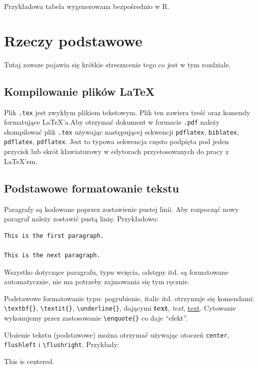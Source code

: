 \documentclass[polish, twoside, 12pt, a4paper]{article}
\theoremstyle{definition}
\theoremstyle{plain}
\theoremstyle{remark}
\begin{document}
Przykładowa tabela wygenerowana bezpośrednio w R.



\clearpage
\section{Rzeczy podstawowe}

Tutaj zawsze pojawia się krótkie streszzcenie tego co jest w tym rozdziale.

\subsection{Kompilowanie plików \LaTeX}

Plik  \verb+.tex+ jest zwykłym plikiem tekstowym. Plik ten zawiera treść oraz komendy formatujące \LaTeX'a.Aby otrzymać dokument w formacie \verb+.pdf+ należy skompilować plik \verb+.tex+ używając następującej sekwencji \verb+pdflatex+, \verb+biblatex+, \verb+pdflatex+, \verb+pdflatex+. Jest to typowa sekwencja często podpięta pod jeden przycisk lub skrót klawiaturowy w edytorach przystosowanych do pracy z \LaTeX'em.

\subsection{Podstawowe formatowanie tekstu}

Paragrafy są kodowane poprzez zostawienie pustej linii. Aby rozpocząć nowy paragraf należy zostawić pustą linię. Przykładowo:
\begin{verbatim}
This is the first paragraph.

This is the next paragraph.
\end{verbatim}

Wszystko dotyczące paragrafu, typu wcięcia, odstępy itd. są formatowane automatycznie, nie ma potrzeby zajmowania się tym ręcznie.

Podstawowe formatowanie typu: pogrubienie, italic itd. otrzymuje się komendami: \verb+\textbf{}+, \verb+\textit{}+, \verb+\underline{}+, dającymi \textbf{text}, \textit{text}, \underline{text}. Cytowanie wykonujemy przez zastosowanie \verb+\enquote{}+ co daje \enquote{efekt}.

Ułożenie tekstu (podstawowe) można otrzymać używając otoczeń \verb+center+, \verb+flushleft+ i \verb+\flushright+. Przykłady:

\begin{center}
  This is centered.
\end{center}
\end{document}
